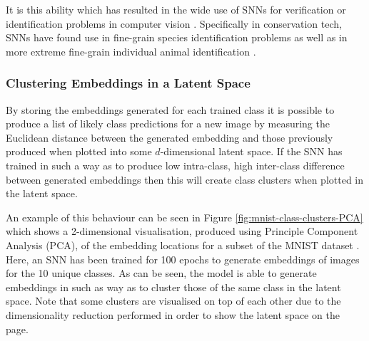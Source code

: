 It is this ability which has resulted in the wide use of SNNs for verification or identification problems in computer vision \cite{dey_signet_2017, wang_discriminative_2020}. Specifically in conservation tech, SNNs have found use in fine-grain species identification problems \cite{vetrova_hidden_2018, araujo_two-view_2022} as well as in more extreme fine-grain individual animal identification \cite{clapham_automated_2020}. 

\subsubsection{Clustering Embeddings in a Latent Space}\label{ch:ID,sec:deciding,sub:SNN,subsub:ClusteringEmbeddings}

By storing the embeddings generated for each trained class it is possible to produce a list of likely class predictions for a new image by measuring the Euclidean distance between the generated embedding and those previously produced when plotted into some $d$-dimensional latent space. If the SNN has trained in such a way as to produce low intra-class, high inter-class difference between generated embeddings then this will create class clusters when plotted in the latent space. 

An example of this behaviour can be seen in Figure \ref{fig:mnist-class-clusters-PCA} which shows a 2-dimensional visualisation, produced using Principle Component Analysis (PCA), of the embedding locations for a subset of the MNIST dataset \cite{lecun_gradient-based_1998}. Here, an SNN has been trained for 100 epochs to generate embeddings of images for the 10 unique classes. As can be seen, the model is able to generate embeddings in such as way as to cluster those of the same class in the latent space. Note that some clusters are visualised on top of each other due to the dimensionality reduction performed in order to show the latent space on the page. 

